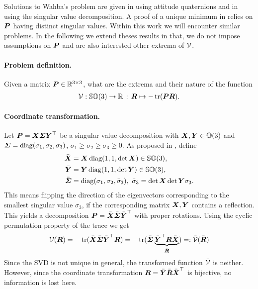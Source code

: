 Solutions to Wahba's problem are given in \cite{Davenport:QMethod} using attitude quaternions and in \cite{Kabsch:SSVD} using the singular value decomposition.
A proof of a unique minimum in \cite{Bullo:TrackingAutomatica} relies on $\boldsymbol{P}$ having distinct singular values.
Within this work we will encounter similar problems.
In the following we extend theses results in that, we do not impose assumptions on $\boldsymbol{P}$ and are also interested other extrema of $\mathcal{V}$.

\paragraph{Problem definition.}
Given a matrix $\boldsymbol{P} \in \mathbb{R}^{3\times3}$, what are the extrema and their nature of the function
\begin{align}
 \mathcal{V}: \mathbb{SO}(3) \rightarrow \mathbb{R} \, : \, \boldsymbol{R} \mapsto -\operatorname{tr}(\boldsymbol{P} \boldsymbol{R}).
\end{align}


\paragraph{Coordinate transformation.}
Let $\boldsymbol{P} = \boldsymbol{X} \boldsymbol{\varSigma} \boldsymbol{Y}^\top$ be a singular value decomposition with $\boldsymbol{X}, \boldsymbol{Y} \in \mathbb{O}(3)$ and $\boldsymbol{\varSigma} = \operatorname{diag}(\sigma_1, \sigma_2, \sigma_3)$, $\sigma_1 \geq \sigma_2 \geq \sigma_3 \geq 0$.
As proposed in \cite{Kabsch:SSVD}, define 
\begin{subequations}\label{eq:DefSSVD}
\begin{align}
 \bar{\boldsymbol{X}} &= \boldsymbol{X} \operatorname{diag}(1, 1, \det\boldsymbol{X}) \in \mathbb{SO}(3),
\\
 \bar{\boldsymbol{Y}} &= \boldsymbol{Y} \operatorname{diag}(1, 1, \det\boldsymbol{Y}) \in \mathbb{SO}(3),
\\
 \bar{\boldsymbol{\varSigma}} &= \operatorname{diag}(\sigma_1, \sigma_2, \bar{\sigma}_3), \ \bar{\sigma}_3 = \det\boldsymbol{X}\det\boldsymbol{Y} \sigma_3 .
\end{align} 
\end{subequations}
This means flipping the direction of the eigenvectors corresponding to the smallest singular value $\sigma_3$, if the corresponding matrix $\boldsymbol{X}, \boldsymbol{Y}$ contains a reflection.
This yields a decomposition $\boldsymbol{P} = \bar{\boldsymbol{X}} \bar{\boldsymbol{\varSigma}} \bar{\boldsymbol{Y}}^\top$ with proper rotations.
Using the cyclic permutation property of the trace we get
\begin{align}\label{eq:AttitudePotentialTrafo}
 \mathcal{V}(\boldsymbol{R}) = -\operatorname{tr}( \bar{\boldsymbol{X}} \bar{\boldsymbol{\varSigma}} \bar{\boldsymbol{Y}}^\top \boldsymbol{R}) = -\operatorname{tr}( \bar{\boldsymbol{\varSigma}} \underbrace{\bar{\boldsymbol{Y}}^\top \boldsymbol{R} \bar{\boldsymbol{X}}}_{\bar{\boldsymbol{R}}}) =: \bar{\mathcal{V}}(\bar{\boldsymbol{R}})
\end{align}
Since the SVD is not unique in general, the transformed function $\bar{\mathcal{V}}$ is neither.
However, since the coordinate transformation $\boldsymbol{R} = \bar{\boldsymbol{Y}} \bar{\boldsymbol{R}} \bar{\boldsymbol{X}}^\top$ is bijective, no information is lost here.

